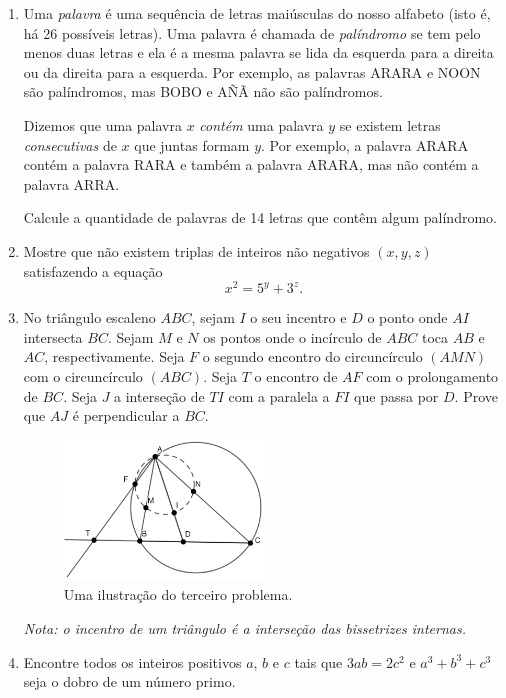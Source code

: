\documentclass[12pt]{article}
\begin{document}
  \begin{enumerate}[label=\textbf{\arabic*.}]
    \item Uma \textit{palavra} é uma sequência de letras maiúsculas do
      nosso alfabeto (isto é, há 26 possíveis letras). Uma palavra é chamada de
      \textit{palíndromo} se tem pelo menos duas letras e ela é a mesma palavra se lida da
      esquerda para a direita ou da direita para a esquerda. Por exemplo, as palavras ARARA
      e NOON são palíndromos, mas BOBO e AÑÃ não são palíndromos.

      Dizemos que uma palavra $x$ \textit{contém} uma palavra $y$ se existem letras
      \textit{consecutivas} de $x$ que juntas formam $y$. Por exemplo, a palavra ARARA
      contém a palavra RARA e também a palavra ARARA, mas não contém a palavra ARRA.

      Calcule a quantidade de palavras de 14 letras que contêm algum palíndromo.

    \item Mostre que não existem triplas de inteiros não negativos
      $(x, y, z)$ satisfazendo a equação
      \[
        x^2 = 5^y + 3^z.
      \]

    \item No triângulo escaleno $ABC$, sejam $I$ o seu incentro e $D$ o
      ponto onde $AI$ intersecta $BC$. Sejam $M$ e $N$ os pontos onde o incírculo de $ABC$
      toca $AB$ e $AC$, respectivamente. Seja $F$ o segundo encontro do circuncírculo $(AMN)$
      com o circuncírculo $(ABC)$. Seja $T$ o encontro de $AF$ com o prolongamento de $BC$.
      Seja $J$ a interseção de $TI$ com a paralela a $FI$ que passa por $D$. Prove que $AJ$ é
      perpendicular a $BC$.

      \begin{figure}[h]
        \centering
          \includegraphics[width=0.5\textwidth]{third.png}
          \caption{Uma ilustração do terceiro problema.}
      \end{figure}

      \textit{Nota: o incentro de um triângulo é a interseção das bissetrizes internas.}

    \item   Encontre todos os inteiros positivos $a$, $b$ e $c$ tais que $3ab = 2c^2$
      e $ a^3 + b^3 + c^3$ seja o dobro de um número primo.
  \end{enumerate}
\end{document}
